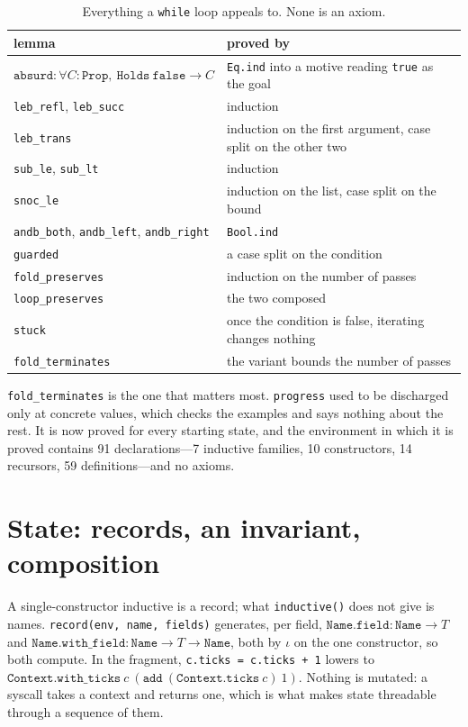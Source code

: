 \documentclass[11pt]{article}
\newcommand{\code}[1]{\texttt{#1}}
\begin{document}
\begin{table}[h]
\centering
\small
\begin{tabular}{ll}
\toprule
lemma & proved by \\
\midrule
$\code{absurd} : \forall C{:}\code{Prop},\ \code{Holds}\ \code{false} \to C$ & \code{Eq.ind} into a motive reading \code{true} as the goal \\
\code{leb\_refl}, \code{leb\_succ} & induction \\
\code{leb\_trans} & induction on the first argument, case split on the other two \\
\code{sub\_le}, \code{sub\_lt} & induction \\
\code{snoc\_le} & induction on the list, case split on the bound \\
\code{andb\_both}, \code{andb\_left}, \code{andb\_right} & \code{Bool.ind} \\
\code{guarded} & a case split on the condition \\
\code{fold\_preserves} & induction on the number of passes \\
\code{loop\_preserves} & the two composed \\
\code{stuck} & once the condition is false, iterating changes nothing \\
\code{fold\_terminates} & the variant bounds the number of passes \\
\bottomrule
\end{tabular}
\caption{Everything a \code{while} loop appeals to. None is an axiom.}
\label{tab:lemmas}
\end{table}

\code{fold\_terminates} is the one that matters most. \code{progress} used to
be discharged only at concrete values, which checks the examples and says
nothing about the rest. It is now proved for every starting state, and the
environment in which it is proved contains 91 declarations---7 inductive
families, 10 constructors, 14 recursors, 59 definitions---and no axioms.

\section{State: records, an invariant, composition}
\label{sec:state}

A single-constructor inductive is a record; what \code{inductive()} does not
give is names. \code{record(env, name, fields)} generates, per field,
$\code{Name.field} : \code{Name} \to T$ and $\code{Name.with\_field} :
\code{Name} \to T \to \code{Name}$, both by $\iota$ on the one constructor, so
both compute. In the fragment, \code{c.ticks = c.ticks + 1} lowers to
$\code{Context.with\_ticks}\ c\ (\code{add}\ (\code{Context.ticks}\ c)\ 1)$.
Nothing is mutated: a syscall takes a context and returns one, which is what
makes state threadable through a sequence of them.
\end{document}
